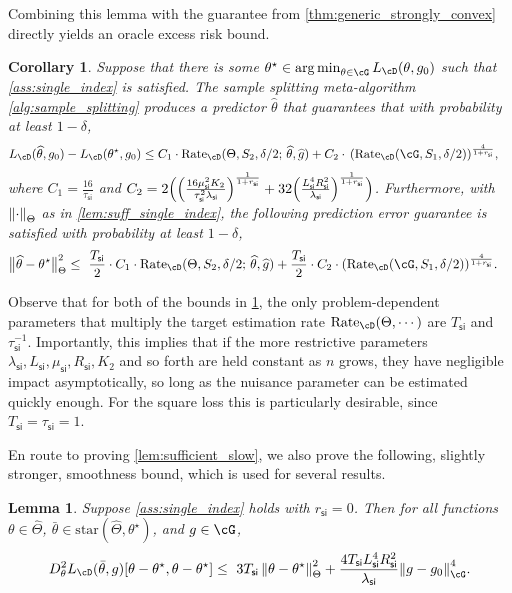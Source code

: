 \documentclass[11pt]{article} %
\newcommand{\pref}[1]{\cref{#1}}
\theoremstyle{theorem}  %
\newtheorem{lemma}{Lemma}
\newtheorem{corollary}{Corollary}
\theoremstyle{plain}
\DeclarePairedDelimiter{\prn}{(}{)}
\DeclarePairedDelimiter{\nrm}{\|}{\|}
\DeclareMathOperator*{\argmin}{arg\,min} %
\newcommand{\wh}[1]{\widehat{#1}}
\newcommand{\midsem}{;\,}
\newcommand{\poprisk}{L_{\cD}}
\newcommand{\starhull}{\mathrm{star}}
\newcommand{\estone}{\wh{g}}
\newcommand{\esttwo}{\wh{\theta}}
\newcommand{\nuisance}{\cG}
\newcommand{\target}{\Theta}
\newcommand{\targetemp}{\wh{\Theta}}
\newcommand{\dimtwo}{K_2}
\newcommand{\Rate}{\mathrm{Rate}_{\cD}}
\newcommand{\besttwo}{\theta^{\star}}
\newcommand{\gtone}{g_0}
\newcommand{\sampleone}{S_1}
\newcommand{\sampletwo}{S_2}
\newcommand{\si}{\mathsf{si}}
\newcommand{\Lsi}{L_{\si}}
\newcommand{\Rsi}{R_{\si}}
\newcommand{\Tsi}{T_{\si}}
\newcommand{\tausi}{\tau_{\si}}
\newcommand{\musi}{\mu_{\si}}
\newcommand{\gammasi}{\lambda_{\si}}
\newcommand{\rsi}{r_{\si}}
\begin{document}
Combining this lemma with the guarantee from \pref{thm:generic_strongly_convex} directly yields an oracle excess risk bound.
%
\begin{corollary}
\label{cor:single_index}
Suppose that there is some $\besttwo\in\argmin_{\theta\in\nuisance}\poprisk(\theta,\gtone)$ such that \pref{ass:single_index} is satisfied. The sample splitting meta-algorithm \pref{alg:sample_splitting} produces a predictor $\esttwo$ that guarantees that with probability at least $1-\delta$,
\begin{align*}
\poprisk(\esttwo,\gtone) - \poprisk(\besttwo,\gtone)
\leq{}& C_1\cdot\Rate(\target, \sampletwo, \delta/2\midsem{}\esttwo,\estone) 
        + C_2\cdot
        \,\prn*{\Rate(\nuisance,\sampleone,\delta/2)}^{\frac{4}{1+\rsi}},
\end{align*}
where $C_1=\frac{16}{\tausi}$ and $C_2=2\prn[\Big]{        \prn*{\frac{16\musi^2\dimtwo}{\tausi^2\gammasi}}^{\frac{1}{1+\rsi}}        + 32\prn*{\frac{\Lsi^4\Rsi^2}{\gammasi}}^{\frac{1}{1+\rsi}}     }$.
Furthermore, with $\nrm*{\cdot}_{\target}$ as in \pref{lem:suff_single_index}, the following prediction error guarantee is satisfied with probability at least $1-\delta$,
\begin{align*}
\nrm[\big]{\esttwo - \besttwo}_{\target}^{2}
\leq{}~&  \frac{\Tsi}{2}\cdot{}C_1\cdot\Rate(\target, \sampletwo, \delta/2\midsem{}\esttwo,\estone) 
         +\frac{\Tsi}{2}\cdot{}C_2\cdot
         \prn*{\Rate(\nuisance,\sampleone,\delta/2)}^{\frac{4}{1+\rsi}}.
\end{align*}
\end{corollary}
Observe that for both of the bounds in \pref{cor:single_index}, the only problem-dependent parameters that multiply the target estimation rate $\Rate(\target,\cdots)$ are $\Tsi$ and $\tausi^{-1}$. Importantly, this implies that if the more restrictive parameters $\gammasi,\Lsi,\musi, \Rsi,\dimtwo$ and so forth are held constant as $n$ grows, they have negligible impact asymptotically, so long as the nuisance parameter can be estimated quickly enough. For the square loss this is particularly desirable, since $\Tsi=\tausi=1$.

En route to proving \pref{lem:sufficient_slow}, we also prove the
following, slightly stronger, smoothness bound, which is used for
several results.
\begin{lemma}
\label{lem:single_index_smooth}
Suppose \pref{ass:single_index} holds with $\rsi=0$. Then for all functions $\theta\in\targetemp$, $\bar{\theta}\in\starhull(\targetemp,\besttwo)$, and $g\in\nuisance$, 
\begin{equation}
D^{2}_{\theta}\poprisk(\bar{\theta}, g)[\theta{}-\besttwo, \theta{}-\besttwo] \leq~ 3\Tsi \, \nrm*{\theta{}-\besttwo}_{\target}^2 + \frac{4\Tsi \Lsi^4  \Rsi^2}{\gammasi}\nrm*{g - \gtone}_{\nuisance}^4.
\end{equation}
\end{lemma}
\end{document}
